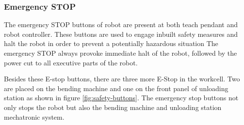 \subsubsection{Emergency STOP}
The emergency STOP buttons of robot are present at both teach pendant and robot controller. These buttons are used to engage inbuilt safety measures and halt the robot in order to
prevent a potentially hazardous situation
The emergency STOP always provoke immediate halt of the robot, followed by the power cut to all
executive parts of the robot.

Besides these E-stop buttons, there are three more E-Stop in the workcell. Two are placed on the bending machine and one on the front panel of unloading station as shown in figure \ref{fig:safety-buttons}. The emergency stop buttons not only stops the robot but also the bending machine and unloading station mechatronic system.


\vspace{1\baselineskip}
